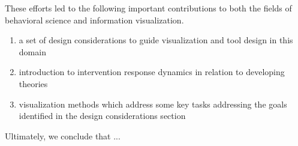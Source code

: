 These efforts led to the following important contributions to both the fields of behavioral science and information visualization.

\begin{enumerate}
	\item{a set of design considerations to guide visualization and tool design in this domain}
	\item{introduction to intervention response dynamics in relation to developing theories}
	\item{visualization methods which address some key tasks addressing the goals identified in the design considerations section}
\end{enumerate}

Ultimately, we conclude that ... %

